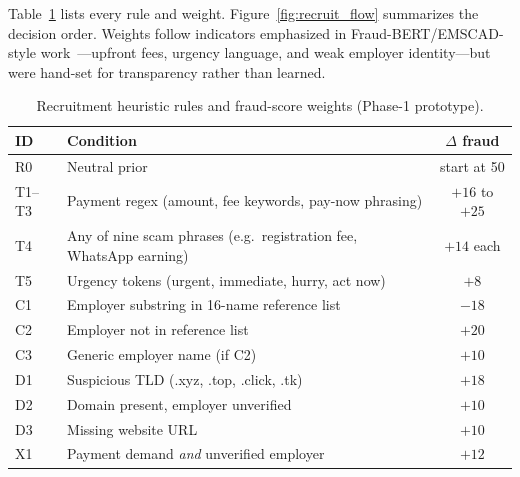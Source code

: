 \documentclass[runningheads]{llncs}
\begin{document}
Table~\ref{tab:recruit_rules} lists every rule and weight. Figure~\ref{fig:recruit_flow} summarizes the decision order. Weights follow indicators emphasized in Fraud-BERT/EMSCAD-style work~\cite{r38,r37}---upfront fees, urgency language, and weak employer identity---but were hand-set for transparency rather than learned.

\begin{table}
\caption{Recruitment heuristic rules and fraud-score weights (Phase-1 prototype).}
\label{tab:recruit_rules}
\small
\begin{tabular}{|l|p{4.8cm}|c|}
\hline
ID & Condition & $\Delta$ fraud\\
\hline
R0 & Neutral prior & start at 50\\
\hline
T1--T3 & Payment regex (amount, fee keywords, pay-now phrasing) & $+16$ to $+25$\\
\hline
T4 & Any of nine scam phrases (e.g.\ registration fee, WhatsApp earning) & $+14$ each\\
\hline
T5 & Urgency tokens (urgent, immediate, hurry, act now) & $+8$\\
\hline
C1 & Employer substring in 16-name reference list & $-18$\\
\hline
C2 & Employer not in reference list & $+20$\\
\hline
C3 & Generic employer name (if C2) & $+10$\\
\hline
D1 & Suspicious TLD (.xyz, .top, .click, .tk) & $+18$\\
\hline
D2 & Domain present, employer unverified & $+10$\\
\hline
D3 & Missing website URL & $+10$\\
\hline
X1 & Payment demand \emph{and} unverified employer & $+12$\\
\hline
\end{tabular}
\end{table}
\end{document}
